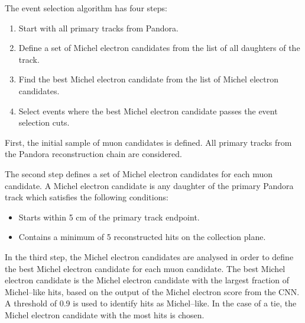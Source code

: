 The event selection algorithm has four steps:
\begin{enumerate}
	\item Start with all primary tracks from Pandora.
	\item Define a set of Michel electron candidates from the list of all
		daughters of the track.
	\item Find the best Michel electron candidate from the list of Michel electron
		candidates.
	\item Select events where the best Michel electron candidate passes the event
		selection cuts.
\end{enumerate}

First, the initial sample of muon candidates is defined. All primary tracks 
from the Pandora reconstruction chain are considered.

The second step defines a set of Michel electron candidates for each muon
candidate. A Michel electron candidate is any daughter of the primary Pandora
track which satisfies the following conditions:
\begin{itemize}
	\item Starts within 5 cm of the primary track endpoint.
	\item Contains a minimum of 5 reconstructed hits on the collection plane.
\end{itemize}

In the third step, the Michel electron candidates are analysed in order to 
define the best Michel electron candidate for each muon candidate. The best 
Michel electron candidate is the Michel electron candidate with the largest 
fraction of Michel--like hits, based on the output of the Michel electron score 
from the CNN. A threshold of 0.9 is used to identify hits as Michel--like. In 
the case of a tie, the Michel electron candidate with the most hits is chosen.

